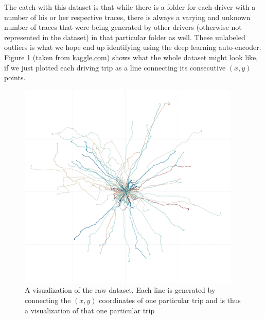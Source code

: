 \documentclass{vldb}
\begin{document}
The catch with this dataset is that while there is a folder for each driver with a number of his or her respective traces, there is always a varying and unknown number of traces that were being generated by other drivers (otherwise not represented in the dataset) in that particular folder as well. These unlabeled outliers is what we hope end up identifying using the deep learning auto-encoder. \\
Figure \ref{fig:axa-trip} (taken from \href{https://www.kaggle.com/c/axa-driver-telematics-analysis/data}{kaggle.com}) shows what the whole dataset might look like, if we just plotted each driving trip as a line connecting its consecutive $(x, y)$ points.
\begin{figure}
\centering
\includegraphics[width=\linewidth]{"pics/axa-trip"}
\caption{A visualization of the raw dataset. Each line is generated by connecting the $(x,y)$ coordinates of one particular trip and is thus a visualization of that one particular trip}
\label{fig:axa-trip}
\end{figure}
\end{document}
